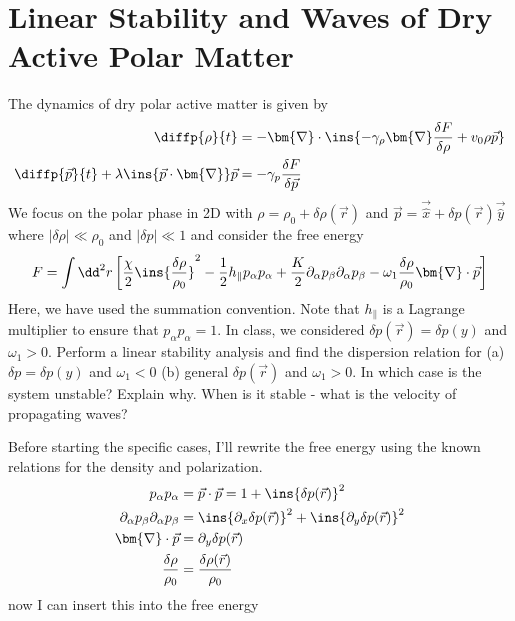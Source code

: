 \clearpage
\section{Linear Stability and Waves of Dry Active Polar Matter}
\begin{colbox}
	The dynamics of dry polar active matter is given by
	\begin{align}
		\diffp{\rho}{t} &= - \bm{\nabla} \cdot\ins{-\gamma_\rho \bm{\nabla} \frac{\delta F}{\delta\rho}+v_0\rho\vec{p}} \\
		\diffp{\vec{p}}{t}+\lambda\ins{\vec{p}\cdot\bm{\nabla}}\vec{p} &= -\gamma_p\frac{\delta F}{\delta \vec{p}}
	\end{align}
	We focus on the polar phase in 2D with \(\rho = \rho_0+\delta\rho(\vec{r})\) and \(\vec{p} = \vec{\hat{x}}+\delta p(\vec{r})\vec{\hat{y}}\) where \(\lvert\delta\rho\rvert\ll\rho_0\) and \(\lvert\delta p\rvert\ll 1\) and consider the free energy
	\begin{equation}
		F = \int \dd^2 r \left[\frac{\chi}{2}\ins{\frac{\delta\rho}{\rho_0}}^2-\frac{1}{2}h_\parallel p_\alpha p_\alpha + \frac{K}{2}\partial_\alpha p_\beta \partial_\alpha p_\beta - \omega_1\frac{\delta\rho}{\rho_0}\bm{\nabla}\cdot\vec{p}\right]
	\end{equation}
	Here, we have used the summation convention. Note that \(h_\parallel\) is a Lagrange multiplier to ensure that \(p_\alpha p_\alpha = 1\). In class, we considered \(\delta p(\vec{r})=\delta p(y)\) and \(\omega_1 > 0\). Perform a linear stability analysis and find the dispersion relation for (a) \(\delta p = \delta p(y)\) and \(\omega_1 < 0\) (b) general \(\delta p(\vec{r})\) and \(\omega_1>0\). In which case is the system unstable? Explain why. When is it stable - what is the velocity of propagating waves?
\end{colbox}
Before starting the specific cases, I'll rewrite the free energy using the known relations for the density and polarization.
\begin{align}
	p_\alpha p_\alpha &= \vec{p}\cdot\vec{p} = 1+\ins{\delta p(\vec{r})}^2 \\
	\partial_\alpha p_\beta \partial_\alpha p_\beta &= \ins{\partial_x \delta p(\vec{r})}^2 + \ins{\partial_y \delta p(\vec{r})}^2 \\
	\bm{\nabla}\cdot\vec{p} &= \partial_y \delta p(\vec{r}) \\
	\frac{\delta\rho}{\rho_0} &= \frac{\delta\rho(\vec{r})}{\rho_0}
\end{align}
now I can insert this into the free energy
